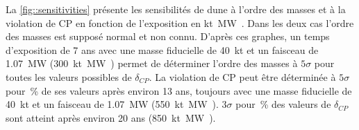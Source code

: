         La \autoref{fig::sensitivities} présente les sensibilités de \gls{dune} à l'ordre des masses et à la violation de CP en fonction de l'exposition en \si{\kilo\tonne\mega\watt\year}. Dans les deux cas l'ordre des masses est supposé normal et  non connu. %
        D'après ces graphes, un temps d'exposition de 7 ans avec une masse fiducielle de \SI{40}{\kilo\tonne} et un faisceau de \SI{1.07}{\mega\watt} (\SI{300}{\kilo\tonne\mega\watt\year}) %
        permet de déterminer l'ordre des masses à $5\sigma$ pour toutes les valeurs possibles de $\delta_{CP}$. La violation de CP peut être déterminée à $5\sigma$ pour \,\% de ses valeurs après environ 13 ans, toujours avec une masse fiducielle de \SI{40}{\kilo\tonne} et un faisceau de \SI{1.07}{\mega\watt} (\SI{550}{\kilo\tonne\mega\watt\year}). $3\sigma$ pour \,\% des valeurs de $\delta_{CP}$ sont atteint après environ 20 ans (\SI{850}{\kilo\tonne\mega\watt\year}).


